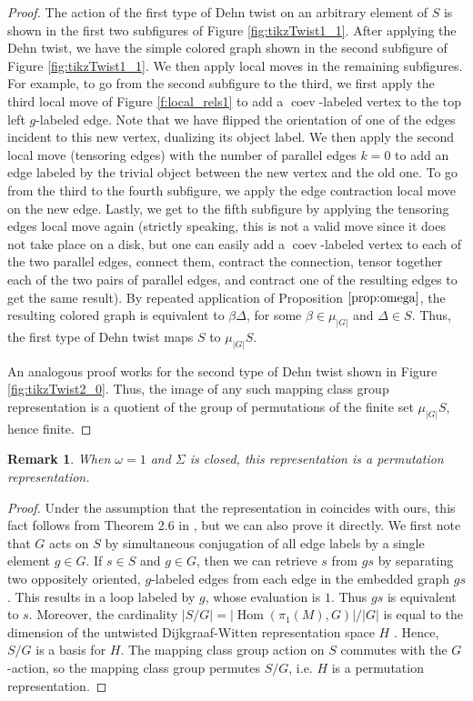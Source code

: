 \documentclass{amsart}
\newtheorem{rmk}[thm]{Remark}
\DeclareMathOperator{\Hom}{Hom}
\DeclareMathOperator{\coev}{coev}
\newcommand{\Si}{\Sigma}
\begin{document}
\begin{proof}
The action of the first type of Dehn twist on an arbitrary element of $S$ is shown in the first two subfigures of Figure \ref{fig:tikzTwist1_1}.  
After applying the Dehn twist, we have the simple colored graph shown in the second subfigure of Figure \ref{fig:tikzTwist1_1}.  We then apply local moves in the remaining subfigures.  For example, to go from the second subfigure to the third, we first apply the third local move of Figure \ref{f:local_rels1} to add a $\coev$-labeled vertex to the top left $g$-labeled edge. Note that we have flipped the orientation of one of the edges incident to this new vertex, dualizing its object label.  We then apply the second local move (tensoring edges) with the number of parallel edges $k = 0$ to add an edge labeled by the trivial object between the new vertex and the old one. To go from the third to the fourth subfigure, we apply the edge contraction local move on the new edge.  Lastly, we get to the fifth subfigure by applying the tensoring edges local move again (strictly speaking, this is not a valid move since it does not take place on a disk, but one can easily add a $\coev$-labeled vertex to each of the two parallel edges, connect them, contract the connection, tensor together each of the two pairs of parallel edges, and contract one of the resulting edges to get the same result). By repeated application of Proposition $\ref{prop:omega}$, the resulting colored graph is equivalent to $\beta \Delta$, for some $\beta \in \mu_{|G|}$ and  $\Delta \in S$.    Thus, the first type of Dehn twist maps $S$ to $\mu_{|G|} S$.

An analogous proof works for the second type of Dehn twist shown in Figure \ref{fig:tikzTwist2_0}. Thus, the image of any such mapping class group representation is a quotient of the group of permutations of the finite set $\mu_{|G|} S$, hence finite.
\end{proof}

\begin{rmk} 
When $\omega = 1$ and $\Si$ is closed, this representation is a permutation representation.  
\end{rmk}

\begin{proof}
Under the assumption that the representation in \cite{fjfu} coincides with ours, this fact follows from Theorem 2.6 in \cite{fjfu}, but we can also prove it directly.  We first note that $G$ acts on $S$ by simultaneous conjugation of all edge labels by a single element $g \in G$.  If $s \in S$ and $g \in G$, then we can retrieve $s$ from $gs$ by separating two oppositely oriented, $g$-labeled edges from each edge in the embedded graph $gs$.  This results in a loop labeled by $g$, whose evaluation is $1$.  Thus $gs$ is equivalent to $s$.  Moreover, the cardinality $|S/G| = |\Hom(\pi_1(M), G)|/|G|$ is equal to the dimension of the untwisted Dijkgraaf-Witten representation space $H$ \cite{dijkgraaf1990}.  Hence, $S/G$ is a basis for $H$.  The mapping class group action on $S$ commutes with the $G$-action, so the mapping class group permutes $S/G$, i.e. $H$ is a permutation representation.
\end{proof}
\end{document}
